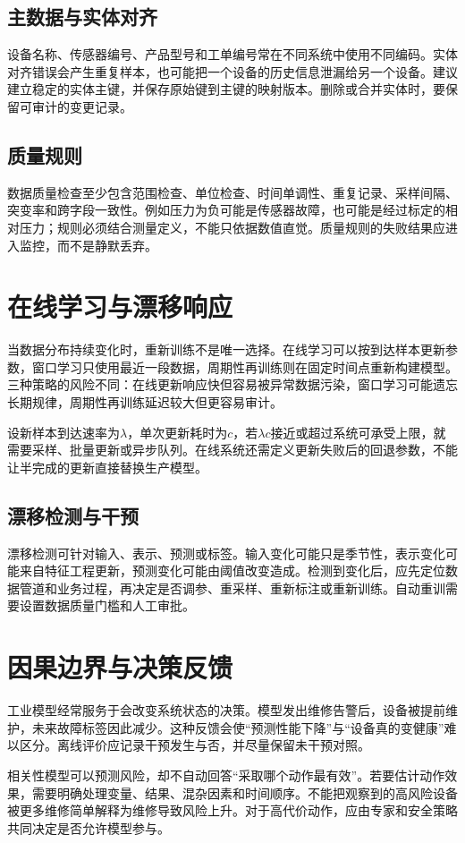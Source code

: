 \subsection{主数据与实体对齐}
设备名称、传感器编号、产品型号和工单编号常在不同系统中使用不同编码。实体对齐错误会产生重复样本，也可能把一个设备的历史信息泄漏给另一个设备。建议建立稳定的实体主键，并保存原始键到主键的映射版本。删除或合并实体时，要保留可审计的变更记录。

\subsection{质量规则}
数据质量检查至少包含范围检查、单位检查、时间单调性、重复记录、采样间隔、突变率和跨字段一致性。例如压力为负可能是传感器故障，也可能是经过标定的相对压力；规则必须结合测量定义，不能只依据数值直觉。质量规则的失败结果应进入监控，而不是静默丢弃。

\section{在线学习与漂移响应}
当数据分布持续变化时，重新训练不是唯一选择。在线学习可以按到达样本更新参数，窗口学习只使用最近一段数据，周期性再训练则在固定时间点重新构建模型。三种策略的风险不同：在线更新响应快但容易被异常数据污染，窗口学习可能遗忘长期规律，周期性再训练延迟较大但更容易审计。

设新样本到达速率为$\lambda$，单次更新耗时为$c$，若$\lambda c$接近或超过系统可承受上限，就需要采样、批量更新或异步队列。在线系统还需定义更新失败后的回退参数，不能让半完成的更新直接替换生产模型。

\subsection{漂移检测与干预}
漂移检测可针对输入、表示、预测或标签。输入变化可能只是季节性，表示变化可能来自特征工程更新，预测变化可能由阈值改变造成。检测到变化后，应先定位数据管道和业务过程，再决定是否调参、重采样、重新标注或重新训练。自动重训需要设置数据质量门槛和人工审批。

\section{因果边界与决策反馈}
工业模型经常服务于会改变系统状态的决策。模型发出维修告警后，设备被提前维护，未来故障标签因此减少。这种反馈会使“预测性能下降”与“设备真的变健康”难以区分。离线评价应记录干预发生与否，并尽量保留未干预对照。

相关性模型可以预测风险，却不自动回答“采取哪个动作最有效”。若要估计动作效果，需要明确处理变量、结果、混杂因素和时间顺序。不能把观察到的高风险设备被更多维修简单解释为维修导致风险上升。对于高代价动作，应由专家和安全策略共同决定是否允许模型参与。

